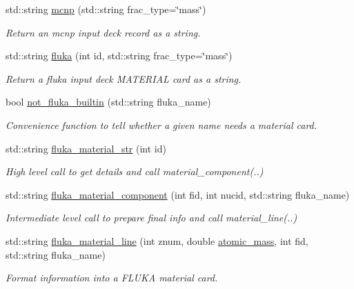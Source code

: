 \begin{DoxyCompactItemize}
std\+::string \hyperlink{classpyne_1_1_material_ac30ed9f082dc76a0c535eb9237a6c528}{mcnp} (std\+::string frac\+\_\+type=\char`\"{}mass\char`\"{})
\begin{DoxyCompactList}\small\item\em Return an mcnp input deck record as a string. \end{DoxyCompactList}\item 
std\+::string \hyperlink{classpyne_1_1_material_a6bcd10072abbf3e9a8bcaa466f8be569}{fluka} (int id, std\+::string frac\+\_\+type=\char`\"{}mass\char`\"{})
\begin{DoxyCompactList}\small\item\em Return a fluka input deck M\+A\+T\+E\+R\+I\+AL card as a string. \end{DoxyCompactList}\item 
bool \hyperlink{classpyne_1_1_material_a97461e1c6a87d91ed1293adbe43cb29e}{not\+\_\+fluka\+\_\+builtin} (std\+::string fluka\+\_\+name)
\begin{DoxyCompactList}\small\item\em Convenience function to tell whether a given name needs a material card. \end{DoxyCompactList}\item 
std\+::string \hyperlink{classpyne_1_1_material_af3f7e0865a7a8019e02c2fb3c408c2f3}{fluka\+\_\+material\+\_\+str} (int id)
\begin{DoxyCompactList}\small\item\em High level call to get details and call material\+\_\+component(..) \end{DoxyCompactList}\item 
std\+::string \hyperlink{classpyne_1_1_material_a3b7bc2f7ca3f2c05860004ea27ebcadb}{fluka\+\_\+material\+\_\+component} (int fid, int nucid, std\+::string fluka\+\_\+name)
\begin{DoxyCompactList}\small\item\em Intermediate level call to prepare final info and call material\+\_\+line(..) \end{DoxyCompactList}\item 
std\+::string \hyperlink{classpyne_1_1_material_a269b13dac00eb3ba0ff31feb5bd3b0ca}{fluka\+\_\+material\+\_\+line} (int znum, double \hyperlink{namespacepyne_aaab79c2417fc60c1a248dd702403befb}{atomic\+\_\+mass}, int fid, std\+::string fluka\+\_\+name)
\begin{DoxyCompactList}\small\item\em Format information into a F\+L\+U\+KA material card. \end{DoxyCompactList}\item 

\end{DoxyCompactItemize}
